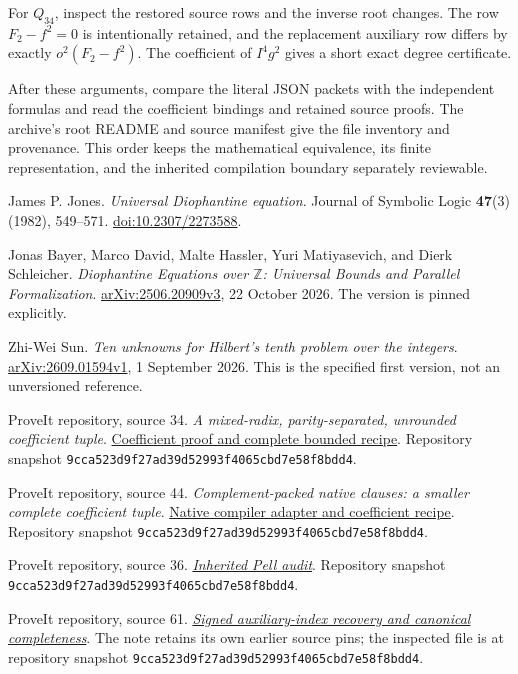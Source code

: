 \documentclass[11pt,a4paper]{article}
\theoremstyle{definition}
\newcommand{\snapshot}{\texttt{9cca523d9f27ad39d52993f4065cbd7e58f8bdd4}}
\newcommand{\repofile}[2]{\href{https://github.com/VladimirReshetnikov/ProveIt/blob/9cca523d9f27ad39d52993f4065cbd7e58f8bdd4/Computability/DiophantineConsistency/#1}{#2}}
\newcommand{\formfile}[2]{\repofile{con-zfc-diophantine-forms/#1}{#2}}
\begin{document}
For \(Q_{34}\), inspect the restored source rows and the inverse root
changes.  The row \(F_2-f^2=0\) is intentionally retained, and the
replacement auxiliary row differs by exactly \(o^2(F_2-f^2)\).
The coefficient of \(I^4g^2\) gives a short exact degree certificate.

After these arguments, compare the literal JSON packets with the
independent formulas and read the coefficient bindings and retained
source proofs.  The archive's root README and source manifest give
the file inventory and provenance.  This order keeps the mathematical
equivalence, its finite representation, and the inherited compilation
boundary separately reviewable.

\begin{thebibliography}{99}
\raggedright
\small

James P. Jones.
\emph{Universal Diophantine equation}.
Journal of Symbolic Logic \textbf{47}(3) (1982), 549--571.
\href{https://doi.org/10.2307/2273588}{doi:10.2307/2273588}.

Jonas Bayer, Marco David, Malte Hassler, Yuri Matiyasevich, and
Dierk Schleicher.
\emph{Diophantine Equations over \(\mathbb Z\): Universal Bounds and
Parallel Formalization}.
\href{https://arxiv.org/abs/2506.20909v3}{arXiv:2506.20909v3},
22 October 2026.  The version is pinned explicitly.

Zhi-Wei Sun.
\emph{Ten unknowns for Hilbert's tenth problem over the integers}.
\href{https://arxiv.org/abs/2609.01594v1}{arXiv:2609.01594v1},
1 September 2026.  This is the specified first version, not an
unversioned reference.

ProveIt repository, source 34.
\emph{A mixed-radix, parity-separated, unrounded coefficient tuple}.
\formfile{34-integer14/coefficients/COEFFICIENT_PROOF.md}
{Coefficient proof and complete bounded recipe}.
Repository snapshot \snapshot.

ProveIt repository, source 44.
\emph{Complement-packed native clauses: a smaller complete coefficient
tuple}.
\formfile{44-b4-sparse/native/PROOF.md}
{Native compiler adapter and coefficient recipe}.
Repository snapshot \snapshot.

ProveIt repository, source 36.
\formfile{36-small-tuple/proofs/INHERITED_PELL_AUDIT.md}
{\emph{Inherited Pell audit}}.
Repository snapshot \snapshot.

ProveIt repository, source 61.
\formfile{61-congruence-carriers/positive/SIGNED_INDEX_LEMMA.md}
{\emph{Signed auxiliary-index recovery and canonical completeness}}.
The note retains its own earlier source pins; the inspected file is
at repository snapshot \snapshot.


\end{thebibliography}
\end{document}
